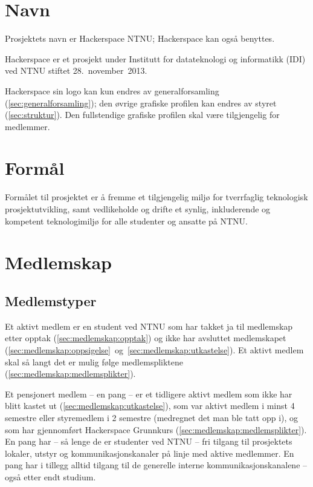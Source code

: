 \section{Navn}\label{sec:navn}
Prosjektets navn er Hackerspace NTNU; Hackerspace kan også benyttes.

Hackerspace er et prosjekt under Institutt for datateknologi og informatikk (IDI) ved NTNU stiftet 28.~november~2013.

Hackerspace sin logo kan kun endres av generalforsamling (\ref{sec:generalforsamling}); den øvrige grafiske profilen kan endres av styret (\ref{sec:struktur}). Den fullstendige grafiske profilen skal være tilgjengelig for medlemmer.


\section{Formål}\label{sec:formål}
Formålet til prosjektet er å fremme et tilgjengelig miljø for tverrfaglig teknologisk prosjektutvikling, samt vedlikeholde og drifte et synlig, inkluderende og kompetent teknologimiljø for alle studenter og ansatte på NTNU.\@


\section{Medlemskap}\label{sec:medlemskap}
\subsection{Medlemstyper}\label{sec:medlemskap:medlemstyper}
Et aktivt medlem er en student ved NTNU som har takket ja til medlemskap etter opptak (\ref{sec:medlemskap:opptak}) og ikke har avsluttet medlemskapet (\ref{sec:medlemskap:oppsigelse}~og~\ref{sec:medlemskap:utkastelse}).
Et aktivt medlem skal så langt det er mulig følge medlemspliktene (\ref{sec:medlemskap:medlemsplikter}).

Et pensjonert medlem -- en pang -- er et tidligere aktivt medlem som ikke har blitt kastet ut (\ref{sec:medlemskap:utkastelse}), som var aktivt medlem i minst 4 semestre eller styremedlem i 2 semestre (medregnet det man ble tatt opp i), og som har gjennomført Hackerspace Grunnkurs (\ref{sec:medlemskap:medlemsplikter}).
En pang har -- så lenge de er studenter ved NTNU -- fri tilgang til prosjektets lokaler, utstyr og kommunikasjonskanaler på linje med aktive medlemmer.
En pang har i tillegg alltid tilgang til de generelle interne kommunikasjonskanalene -- også etter endt studium.

